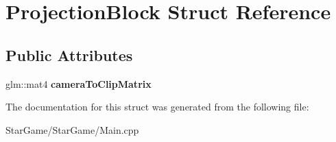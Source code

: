 \hypertarget{struct_projection_block}{\section{Projection\-Block Struct Reference}
\label{struct_projection_block}
}
\subsection*{Public Attributes}
\begin{DoxyCompactItemize}
\item 
\hypertarget{struct_projection_block_a48f6967261c564c3bd58c4c16b93af8b}{glm\-::mat4 {\bfseries camera\-To\-Clip\-Matrix}}\label{struct_projection_block_a48f6967261c564c3bd58c4c16b93af8b}

\end{DoxyCompactItemize}


The documentation for this struct was generated from the following file\-:\begin{DoxyCompactItemize}
\item 
Star\-Game/\-Star\-Game/Main.\-cpp\end{DoxyCompactItemize}
